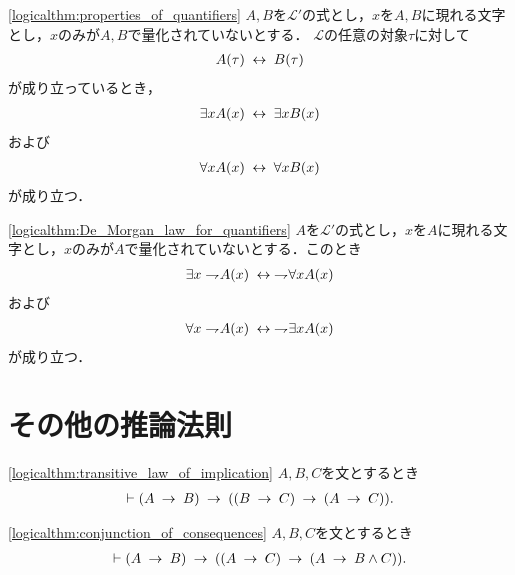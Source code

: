 	\begin{screen}
		\begin{logicalthm}[量化記号の性質(イ)]
		\ref{logicalthm:properties_of_quantifiers}
			$A,B$を$\mathcal{L}'$の式とし，$x$を$A,B$に現れる文字とし，$x$のみが$A,B$で量化されていないとする．
			$\mathcal{L}$の任意の対象$\tau$に対して
			\begin{align}
				A(\tau) \hspace{0.25em}\leftrightarrow\hspace{0.25em} B(\tau)
			\end{align}
			が成り立っているとき，
			\begin{align}
				\exists x A(x) \hspace{0.25em}\leftrightarrow\hspace{0.25em} \exists x B(x)
			\end{align}
			および
			\begin{align}
				\forall x A(x) \hspace{0.25em}\leftrightarrow\hspace{0.25em} \forall x B(x)
			\end{align}
			が成り立つ．
		\end{logicalthm}
	\end{screen}
	
	\begin{screen}
		\begin{logicalthm}
		\ref{logicalthm:De_Morgan_law_for_quantifiers}
			$A$を$\mathcal{L}'$の式とし，$x$を$A$に現れる文字とし，$x$のみが$A$で量化されていないとする．このとき
			\begin{align}
				\exists x \rightharpoondown\hspace{-0.25em} A(x) \hspace{0.25em}\leftrightarrow\hspace{0.25em} \rightharpoondown\hspace{-0.25em} \forall x A(x)
			\end{align}
			および
			\begin{align}
				\forall x \rightharpoondown\hspace{-0.25em} A(x) \hspace{0.25em}\leftrightarrow\hspace{0.25em} \rightharpoondown\hspace{-0.25em} \exists x A(x)
			\end{align}
			が成り立つ．
		\end{logicalthm}
	\end{screen}

\section{その他の推論法則}
	\begin{screen}
		\begin{logicalthm}[含意の推移律]
		\ref{logicalthm:transitive_law_of_implication}
			$A,B,C$を文とするとき
			\begin{align}
				\vdash (A \hspace{0.25em}\rightarrow\hspace{0.25em} B) \hspace{0.25em}\rightarrow\hspace{0.25em} ((B \hspace{0.25em}\rightarrow\hspace{0.25em} C) \hspace{0.25em}\rightarrow\hspace{0.25em} (A \hspace{0.25em}\rightarrow\hspace{0.25em} C)).
			\end{align}
		\end{logicalthm}
	\end{screen}
	
	\begin{screen}
		\begin{logicalthm}[二式が同時に導かれるならその論理積が導かれる]
		\ref{logicalthm:conjunction_of_consequences}
			$A,B,C$を文とするとき
			\begin{align}
				\vdash (A \hspace{0.25em}\rightarrow\hspace{0.25em} B) \hspace{0.25em}\rightarrow\hspace{0.25em} ((A \hspace{0.25em}\rightarrow\hspace{0.25em} C) 
				\hspace{0.25em}\rightarrow\hspace{0.25em} (A \hspace{0.25em}\rightarrow\hspace{0.25em} B \wedge C)).
			\end{align}
		\end{logicalthm}
	\end{screen}
	
